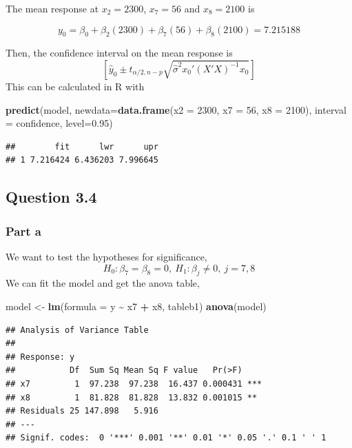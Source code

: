 \documentclass[
  11pt,
]{article}
\newenvironment{Shaded}{\begin{snugshade}}{\end{snugshade}}
\newcommand{\AttributeTok}[1]{\textcolor[rgb]{0.13,0.29,0.53}{#1}}
\newcommand{\DecValTok}[1]{\textcolor[rgb]{0.00,0.00,0.81}{#1}}
\newcommand{\FloatTok}[1]{\textcolor[rgb]{0.00,0.00,0.81}{#1}}
\newcommand{\FunctionTok}[1]{\textcolor[rgb]{0.13,0.29,0.53}{\textbf{#1}}}
\newcommand{\NormalTok}[1]{#1}
\newcommand{\OtherTok}[1]{\textcolor[rgb]{0.56,0.35,0.01}{#1}}
\newcommand{\SpecialCharTok}[1]{\textcolor[rgb]{0.81,0.36,0.00}{\textbf{#1}}}
\newcommand{\StringTok}[1]{\textcolor[rgb]{0.31,0.60,0.02}{#1}}
\begin{document}
The mean response at \(x_2 = 2300\), \(x_7 = 56\) and \(x_8 = 2100\) is

\[y_0 = \beta_0 + \beta_2 (2300) + \beta_7 (56) + \beta_8 (2100) = 7.215188\]

Then, the confidence interval on the mean response is
\[\left[\hat{y}_0 \pm t_{\alpha/2,n-p}\sqrt{\hat{\sigma}^2x_0'(X'X)^{-1}x_0}\right]\]
This can be calculated in R with

\begin{Shaded}
\begin{Highlighting}[]
\FunctionTok{predict}\NormalTok{(model, }\AttributeTok{newdata=}\FunctionTok{data.frame}\NormalTok{(}\AttributeTok{x2 =} \DecValTok{2300}\NormalTok{, }\AttributeTok{x7 =} \DecValTok{56}\NormalTok{, }\AttributeTok{x8 =} \DecValTok{2100}\NormalTok{),}
        \AttributeTok{interval =} \StringTok{\textquotesingle{}confidence\textquotesingle{}}\NormalTok{, }\AttributeTok{level=}\FloatTok{0.95}\NormalTok{)}
\end{Highlighting}
\end{Shaded}

\begin{verbatim}
##        fit      lwr      upr
## 1 7.216424 6.436203 7.996645
\end{verbatim}

\subsection{Question 3.4}\label{question-3.4-1}

\subsubsection{Part a}\label{part-a}

We want to test the hypotheses for significance,
\[H_0: \beta_7 = \beta_8 = 0, \ H_1: \beta_j \neq 0, \ j = 7,8\] We can
fit the model and get the anova table,

\begin{Shaded}
\begin{Highlighting}[]
\NormalTok{model }\OtherTok{\textless{}{-}} \FunctionTok{lm}\NormalTok{(}\AttributeTok{formula =}\NormalTok{ y }\SpecialCharTok{\textasciitilde{}}\NormalTok{ x7 }\SpecialCharTok{+}\NormalTok{ x8, tableb1)}
\FunctionTok{anova}\NormalTok{(model)}
\end{Highlighting}
\end{Shaded}

\begin{verbatim}
## Analysis of Variance Table
## 
## Response: y
##           Df  Sum Sq Mean Sq F value   Pr(>F)    
## x7         1  97.238  97.238  16.437 0.000431 ***
## x8         1  81.828  81.828  13.832 0.001015 ** 
## Residuals 25 147.898   5.916                     
## ---
## Signif. codes:  0 '***' 0.001 '**' 0.01 '*' 0.05 '.' 0.1 ' ' 1
\end{verbatim}
\end{document}
